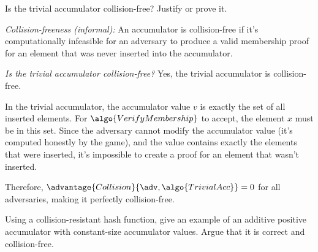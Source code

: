 \begin{exercise}
  Is the trivial accumulator collision-free?
  Justify or prove it.
\end{exercise}

\ifsolutions
\begin{mysolution}
  \emph{Collision-freeness (informal):} An accumulator is collision-free if it's computationally infeasible for an adversary to produce a valid membership proof for an element that was never inserted into the accumulator.
  
  \emph{Is the trivial accumulator collision-free?} Yes, the trivial accumulator is collision-free.
  
  In the trivial accumulator, the accumulator value $v$ is exactly the set of all inserted elements.
  For $\algo{VerifyMembership}$ to accept, the element $x$ must be in this set.
  Since the adversary cannot modify the accumulator value (it's computed honestly by the game), and the value contains exactly the elements that were inserted, it's impossible to create a proof for an element that wasn't inserted.
  
  Therefore, $\advantage{Collision}{\adv, \algo{TrivialAcc}} = 0$ for all adversaries, making it perfectly collision-free.
\end{mysolution}
\fi

\begin{exercise}
  Using a collision-resistant hash function, give an example of an additive positive accumulator with constant-size accumulator values.
  Argue that it is correct and collision-free.
\end{exercise}

